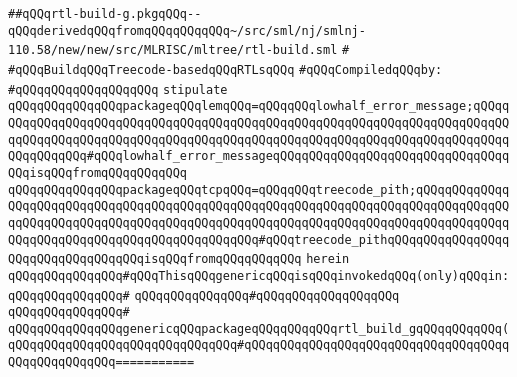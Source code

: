 \label{src/lib/compiler/back/low/treecode/rtl-build-g.pkg}
\verb|##qQQqrtl-build-g.pkgqQQq--qQQqderivedqQQqfromqQQqqQQqqQQq~/src/sml/nj/smlnj-110.58/new/new/src/MLRISC/mltree/rtl-build.sml|\newline
\verb|#|\newline
\verb|#qQQqBuildqQQqTreecode-basedqQQqRTLsqQQq|\newline
\newline
\verb|#qQQqCompiledqQQqby:|\newline
\verb|#qQQqqQQqqQQqqQQqqQQq|\newline
\newline
\verb|stipulate|\newline
\verb|qQQqqQQqqQQqqQQqpackageqQQqlemqQQq=qQQqqQQqlowhalf_error_message;qQQqqQQqqQQqqQQqqQQqqQQqqQQqqQQqqQQqqQQqqQQqqQQqqQQqqQQqqQQqqQQqqQQqqQQqqQQqqQQqqQQqqQQqqQQqqQQqqQQqqQQqqQQqqQQqqQQqqQQqqQQqqQQqqQQqqQQqqQQqqQQqqQQqqQQqqQQq#qQQqlowhalf_error_messageqQQqqQQqqQQqqQQqqQQqqQQqqQQqqQQqqQQqisqQQqfromqQQqqQQqqQQq|\newline
\verb|qQQqqQQqqQQqqQQqpackageqQQqtcpqQQq=qQQqqQQqtreecode_pith;qQQqqQQqqQQqqQQqqQQqqQQqqQQqqQQqqQQqqQQqqQQqqQQqqQQqqQQqqQQqqQQqqQQqqQQqqQQqqQQqqQQqqQQqqQQqqQQqqQQqqQQqqQQqqQQqqQQqqQQqqQQqqQQqqQQqqQQqqQQqqQQqqQQqqQQqqQQqqQQqqQQqqQQqqQQqqQQqqQQqqQQqqQQq#qQQqtreecode_pithqQQqqQQqqQQqqQQqqQQqqQQqqQQqqQQqqQQqisqQQqfromqQQqqQQqqQQq|\newline
\verb|herein|\newline
\verb|qQQqqQQqqQQqqQQq#qQQqThisqQQqgenericqQQqisqQQqinvokedqQQq(only)qQQqin:|\newline
\verb|qQQqqQQqqQQqqQQq#|\newline
\verb|qQQqqQQqqQQqqQQq#qQQqqQQqqQQqqQQqqQQq|\newline
\verb|qQQqqQQqqQQqqQQq#|\newline
\verb|qQQqqQQqqQQqqQQqgenericqQQqpackageqQQqqQQqqQQqrtl_build_gqQQqqQQqqQQq(|\newline
\verb|qQQqqQQqqQQqqQQqqQQqqQQqqQQqqQQq#qQQqqQQqqQQqqQQqqQQqqQQqqQQqqQQqqQQqqQQqqQQqqQQqqQQq===========|\newline
